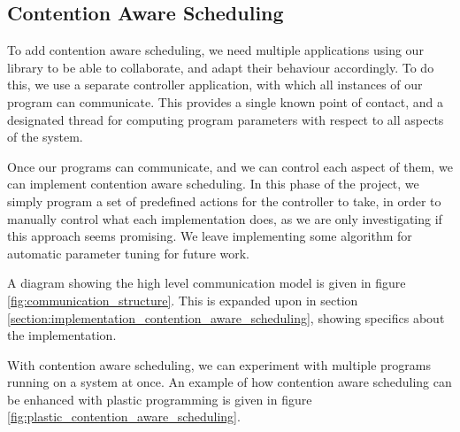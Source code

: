 \subsection{Contention Aware Scheduling}
\label{subsection:design_contention_aware_scheduling}

To add contention aware scheduling, we need multiple applications using our library to be able to collaborate, and adapt their behaviour accordingly. To do this, we use a separate controller application, with which all instances of our program can communicate. This provides a single known point of contact, and a designated thread for computing program parameters with respect to all aspects of the system.

Once our programs can communicate, and we can control each aspect of them, we can implement contention aware scheduling. In this phase of the project, we simply program a set of predefined actions for the controller to take, in order to manually control what each implementation does, as we are only investigating if this approach seems promising. We leave implementing some algorithm for automatic parameter tuning for future work.

A diagram showing the high level communication model is given in figure \ref{fig:communication_structure}. This is expanded upon in section \ref{section:implementation_contention_aware_scheduling}, showing specifics about the implementation.

With contention aware scheduling, we can experiment with multiple programs running on a system at once. An example of how contention aware scheduling can be enhanced with plastic programming is given in figure \ref{fig:plastic_contention_aware_scheduling}.



